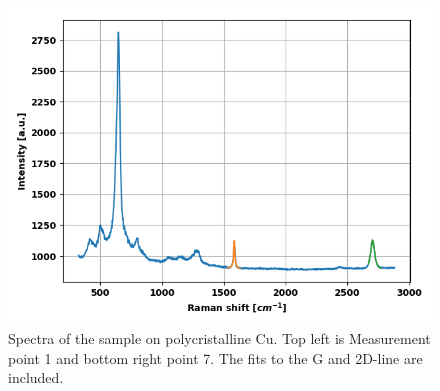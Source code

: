\documentclass[12pt,a4paper]{article}
\begin{document}
\begin{figure}
\includegraphics[scale=0.5]{Bilder/part6/7.png}
\caption{Spectra of the sample on polycristalline Cu. Top left is Measurement point 1 and bottom right point 7. The fits to the G and 2D-line are included.}
\label{fig:appendix_6}
\end{figure}




\end{document}
